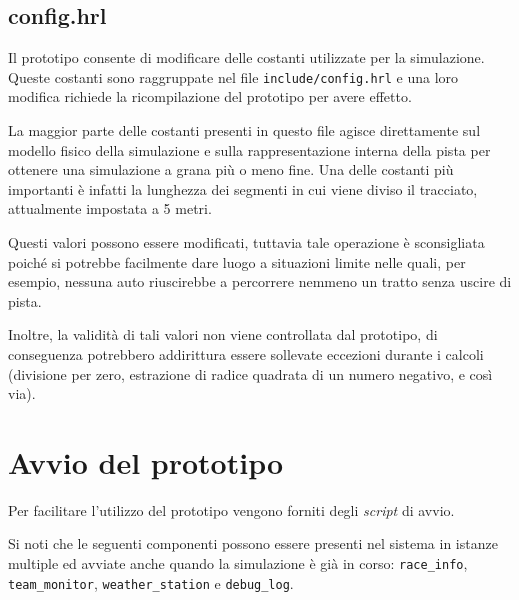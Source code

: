 \documentclass[a4paper]{report}
\begin{document}
\section*{config.hrl}
Il prototipo consente di modificare delle costanti utilizzate per la simulazione.
Queste costanti sono raggruppate nel file \texttt{include/config.hrl} e una loro modifica richiede la ricompilazione del prototipo per avere effetto.

La maggior parte delle costanti presenti in questo file agisce direttamente sul modello fisico della simulazione e sulla rappresentazione interna della pista per ottenere una simulazione a grana più o meno fine. Una delle costanti più importanti è infatti la lunghezza dei segmenti in cui viene diviso il tracciato, attualmente impostata a 5 metri.

Questi valori possono essere modificati, tuttavia tale operazione è sconsigliata poiché si potrebbe facilmente dare luogo a situazioni limite nelle quali, per esempio, nessuna auto riuscirebbe a percorrere nemmeno un tratto senza uscire di pista.

Inoltre, la validità di tali valori non viene controllata dal prototipo, di conseguenza potrebbero addirittura essere sollevate eccezioni durante i calcoli (divisione per zero, estrazione di radice quadrata di un numero negativo, e così via).


\chapter{Avvio del prototipo}
Per facilitare l'utilizzo del prototipo vengono forniti degli \textit{script} di avvio.

Si noti che le seguenti componenti possono essere presenti nel sistema in istanze multiple ed avviate anche quando la simulazione è già in corso: \texttt{race\_info}, \texttt{team\_monitor}, \texttt{weather\_station} e \texttt{debug\_log}.
\end{document}
